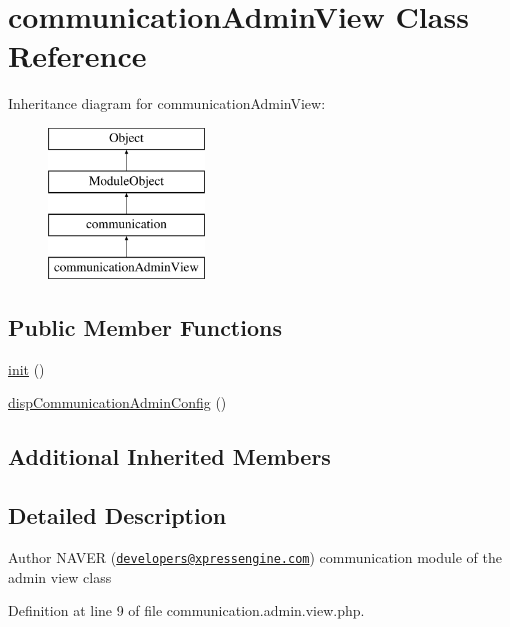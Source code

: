 \hypertarget{classcommunicationAdminView}{\section{communication\-Admin\-View Class Reference}
\label{classcommunicationAdminView}
}
Inheritance diagram for communication\-Admin\-View\-:\begin{figure}[H]
\begin{center}
\leavevmode
\includegraphics[height=4.000000cm]{classcommunicationAdminView}
\end{center}
\end{figure}
\subsection*{Public Member Functions}
\begin{DoxyCompactItemize}
\item 
\hyperlink{classcommunicationAdminView_a75c54eb9cc38929b399c2e5aa600c979}{init} ()
\item 
\hyperlink{classcommunicationAdminView_a622dd5ee36cad7a2c2e9d9eea814b0eb}{disp\-Communication\-Admin\-Config} ()
\end{DoxyCompactItemize}
\subsection*{Additional Inherited Members}


\subsection{Detailed Description}
\begin{DoxyAuthor}{Author}
N\-A\-V\-E\-R (\href{mailto:developers@xpressengine.com}{\tt developers@xpressengine.\-com}) communication module of the admin view class 
\end{DoxyAuthor}


Definition at line 9 of file communication.\-admin.\-view.\-php.



